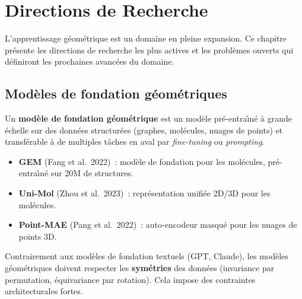 \chapter{Directions de Recherche}
\label{ch:recherche}

\begin{intuition}
L'apprentissage g\'eom\'etrique est un domaine en pleine expansion.
Ce chapitre pr\'esente les directions de recherche les plus actives
et les probl\`emes ouverts qui d\'efiniront les prochaines avanc\'ees
du domaine.
\end{intuition}

\section{Mod\`eles de fondation g\'eom\'etriques}
\label{sec:foundation_models}

\begin{definition}
Un \textbf{mod\`ele de fondation g\'eom\'etrique} est un mod\`ele
pr\'e-entra\^\i n\'e \`a grande \'echelle sur des donn\'ees
structur\'ees (graphes, mol\'ecules, nuages de points) et
transf\'erable \`a de multiples t\^aches en aval par
\emph{fine-tuning} ou \emph{prompting}.
\end{definition}

\begin{exemple}
\begin{itemize}
  \item \textbf{GEM} (Fang et al.\ 2022)~: mod\`ele de fondation
        pour les mol\'ecules, pr\'e-entra\^\i n\'e sur 20M de
        structures.
  \item \textbf{Uni-Mol} (Zhou et al.\ 2023)~: repr\'esentation
        unifi\'ee 2D/3D pour les mol\'ecules.
  \item \textbf{Point-MAE} (Pang et al.\ 2022)~: auto-encodeur
        masqu\'e pour les nuages de points 3D.
\end{itemize}
\end{exemple}

\begin{remarque}
Contrairement aux mod\`eles de fondation textuels (GPT, Claude),
les mod\`eles g\'eom\'etriques doivent respecter les
\textbf{sym\'etries} des donn\'ees (invariance par permutation,
\'equivariance par rotation). Cela impose des contraintes
architecturales fortes.
\end{remarque}

